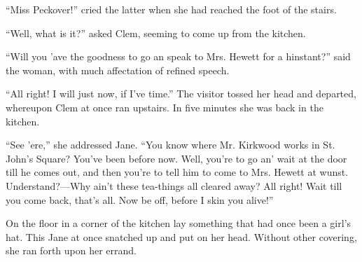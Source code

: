 ``Miss Peckover!'' cried the latter when she had reached the foot of the
stairs.

``Well, what is it?'' asked Clem, seeming to come up from the kitchen.

``Will you 'ave the goodness to go an speak to Mrs. Hewett for a
hinstant?'' said the woman, with much affectation of refined speech.

``All right! I will just now, if I've time.'' The visitor tossed her
head and departed, whereupon Clem at once ran upstairs. In five minutes
she was back in the kitchen.

{}``See 'ere,'' she addressed Jane. ``You know where Mr. Kirkwood works
in St. John's Square? You've been before now. Well, you're to go an'
wait at the door till he comes out, and then you're to tell him to come
to Mrs. Hewett at wunst. Understand?---Why ain't these tea-things all
cleared away? All right! Wait till you come back, that's all. Now be
off, before I skin you alive!''

On the floor in a corner of the kitchen lay something that had once been
a girl's hat. This Jane at once snatched up and put on her head. Without
other covering, she ran forth upon her errand.
